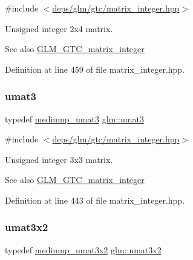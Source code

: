 {\ttfamily \#include $<$\hyperlink{matrix__integer_8hpp}{deps/glm/gtc/matrix\+\_\+integer.\+hpp}$>$}

Unsigned integer 2x4 matrix. \begin{DoxySeeAlso}{See also}
\hyperlink{group__gtc__matrix__integer}{G\+L\+M\+\_\+\+G\+T\+C\+\_\+matrix\+\_\+integer} 
\end{DoxySeeAlso}


Definition at line 459 of file matrix\+\_\+integer.\+hpp.

\mbox{\label{group__gtc__matrix__integer_ga8b8fbc858e28abf8fc344744f8d6d368}} 
\subsubsection{\texorpdfstring{umat3}{umat3}}
{\footnotesize\ttfamily typedef \hyperlink{group__gtc__matrix__integer_gaa677ebd95702fc95054de7a4fb4c907f}{mediump\+\_\+umat3} \hyperlink{group__gtc__matrix__integer_ga8b8fbc858e28abf8fc344744f8d6d368}{glm\+::umat3}}



{\ttfamily \#include $<$\hyperlink{matrix__integer_8hpp}{deps/glm/gtc/matrix\+\_\+integer.\+hpp}$>$}

Unsigned integer 3x3 matrix. \begin{DoxySeeAlso}{See also}
\hyperlink{group__gtc__matrix__integer}{G\+L\+M\+\_\+\+G\+T\+C\+\_\+matrix\+\_\+integer} 
\end{DoxySeeAlso}


Definition at line 443 of file matrix\+\_\+integer.\+hpp.

\mbox{\label{group__gtc__matrix__integer_ga257300f2710612877ef45438a366e308}} 
\subsubsection{\texorpdfstring{umat3x2}{umat3x2}}
{\footnotesize\ttfamily typedef \hyperlink{group__gtc__matrix__integer_gad27333d041d86c7b0b78010c5a437846}{mediump\+\_\+umat3x2} \hyperlink{group__gtc__matrix__integer_ga257300f2710612877ef45438a366e308}{glm\+::umat3x2}}



